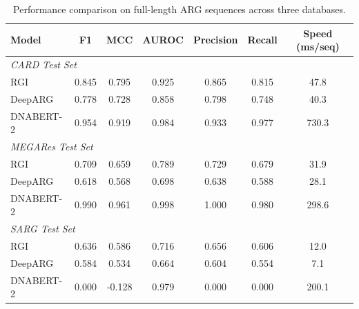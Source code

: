 \begin{table}[t]
\centering
\caption{Performance comparison on full-length ARG sequences across three databases.}
\label{tab:main_results}
\begin{tabular}{l cccccc}
\toprule
Model & F1 & MCC & AUROC & Precision & Recall & Speed (ms/seq) \\
\midrule
\multicolumn{7}{l}{\textit{CARD Test Set}} \\
RGI & 0.845 & 0.795 & 0.925 & 0.865 & 0.815 & 47.8 \\
DeepARG & 0.778 & 0.728 & 0.858 & 0.798 & 0.748 & 40.3 \\
DNABERT-2 & 0.954 & 0.919 & 0.984 & 0.933 & 0.977 & 730.3 \\
\midrule
\multicolumn{7}{l}{\textit{MEGARes Test Set}} \\
RGI & 0.709 & 0.659 & 0.789 & 0.729 & 0.679 & 31.9 \\
DeepARG & 0.618 & 0.568 & 0.698 & 0.638 & 0.588 & 28.1 \\
DNABERT-2 & 0.990 & 0.961 & 0.998 & 1.000 & 0.980 & 298.6 \\
\midrule
\multicolumn{7}{l}{\textit{SARG Test Set}} \\
RGI & 0.636 & 0.586 & 0.716 & 0.656 & 0.606 & 12.0 \\
DeepARG & 0.584 & 0.534 & 0.664 & 0.604 & 0.554 & 7.1 \\
DNABERT-2 & 0.000 & -0.128 & 0.979 & 0.000 & 0.000 & 200.1 \\
\bottomrule
\end{tabular}
\end{table}
